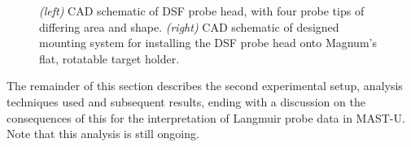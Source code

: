 \documentclass[a4paper, 12pt]{article} %
\begin{document}
	\begin{figure}
		\vspace{-10pt}
		\centering
		\caption{\label{fig:dsfprobe}\textit{(left)} CAD schematic of DSF probe head, with four probe tips of differing area and shape. \textit{(right)} CAD schematic of designed mounting system for installing the DSF probe head onto Magnum's flat, rotatable target holder.}
		\vspace{-10pt}
	\end{figure}
	
	The remainder of this section describes the second experimental setup, analysis techniques used and subsequent results, ending with a discussion on the consequences of this for the interpretation of Langmuir probe data in MAST-U. 
	Note that this analysis is still ongoing. 
\end{document}
